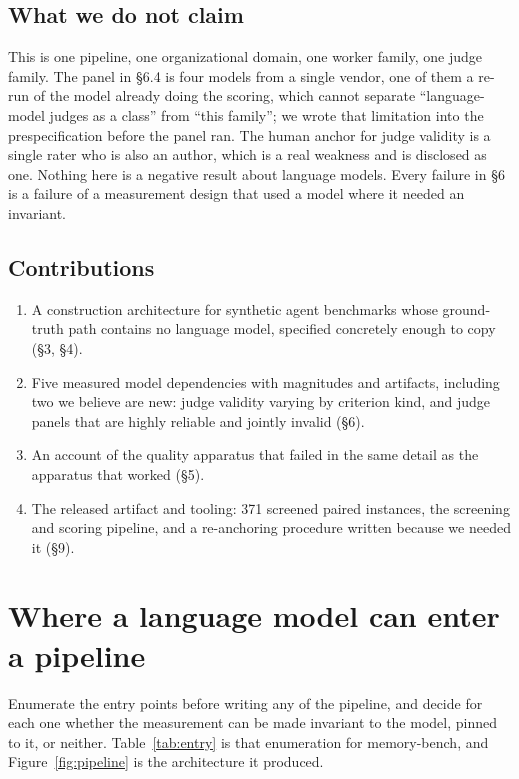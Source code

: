 \documentclass[11pt]{article}
\begin{document}
\subsection{What we do not claim}

This is one pipeline, one organizational domain, one worker family, one judge
family. The panel in \S6.4 is four models from a single vendor, one of them a
re-run of the model already doing the scoring, which cannot separate
``language-model judges as a class'' from ``this family''; we wrote that
limitation into the prespecification before the panel ran. The human anchor for judge validity is a single rater who is also an
author, which is a real weakness and is disclosed as one. Nothing here is a
negative result about language models. Every failure in \S6 is a failure of a
measurement design that used a model where it needed an invariant.

\subsection{Contributions}

\begin{enumerate}[leftmargin=1.4em, itemsep=1pt, topsep=2pt]
\item A construction architecture for synthetic agent benchmarks whose
  ground-truth path contains no language model, specified concretely enough to
  copy (\S3, \S4).
\item Five measured model dependencies with magnitudes and artifacts, including
  two we believe are new: judge validity varying by criterion kind, and judge
  panels that are highly reliable and jointly invalid (\S6).
\item An account of the quality apparatus that failed in the same detail as the
  apparatus that worked (\S5).
\item The released artifact and tooling: 371 screened paired instances, the
  screening and scoring pipeline, and a re-anchoring procedure written because
  we needed it (\S9).
\end{enumerate}

\section{Where a language model can enter a pipeline}

Enumerate the entry points before writing any of the pipeline, and decide for
each one whether the measurement can be made invariant to the model, pinned to
it, or neither. Table~\ref{tab:entry} is that enumeration for memory-bench,
and Figure~\ref{fig:pipeline} is the architecture it produced.
\end{document}
